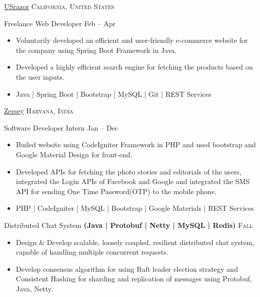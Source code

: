 \documentclass[10pt,a4paper]{article}
\begin{document}
{{\headedsection  %
  {\href{http://www.usrazor.com/}{USrazor}}
  {\textsc{California, United States}} {%
  \headedsubsection
    {Freelance Web Developer}
    {Feb  -- Apr }
    {\bodytext
    {
    \begin{itemize}
        \item Voluntarily developed an efficient and user-friendly e-commerce website for the company using Spring Boot Framework in Java.
        \item Developed a highly efficient search engine for fetching the products based on the user inputs.
        \item Java | Spring Boot | Bootstrap | MySQL | Git | REST Services
    \end{itemize}}}
}

\headedsection  %
  {\href{http://www.zersey.com/}{Zersey}}
  {\textsc{Haryana, India}} {%
  \headedsubsection
    {Software Developer Intern}
    {Jan  -- Dec }
    {\bodytext
    {
    \begin{itemize}
        \item Builed website using CodeIgniter Framework in PHP and used bootstrap and Google Material Design for front-end.
        \item Developed APIs for fetching the photo stories and editorials of the users, integrated the Login APIs of Facebook and Google and integrated the SMS API for sending One Time Password(OTP) to the mobile phone.
        \item PHP | CodeIgniter | MySQL | Bootstrap | Google Materials | REST Services
    \end{itemize}}}
}

\spacedhrule{0.0em}{-0.4em}



\headedsection  %
  {{Distributed Chat System}
  \textbf{
  \small{(Java | Protobuf | Netty | MySQL | Redis)}}}
  {\textsc{Fall }} {%
  
    {\bodytext
    {
    \begin{itemize}
        \item Design \& Develop scalable, loosely coupled, resilient distributed chat system, capable of handling multiple concurrent requests. 
        \item Develop consensus algorithm for using Raft leader election strategy and Consistent Hashing for sharding and replication of messages using Protobuf, Java, Netty.
    \end{itemize}}}
}

}}
\end{document}
